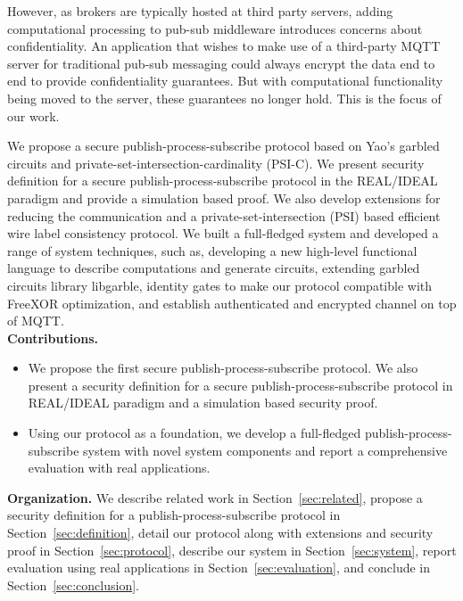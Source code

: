 However, as brokers are typically hosted at third party servers, adding
computational processing to pub-sub middleware  introduces concerns about
confidentiality. An application that wishes to make use of a third-party MQTT
server for traditional pub-sub messaging could always encrypt the data end to
end to provide confidentiality guarantees. But with computational functionality
being moved to the server, these guarantees no longer hold. This is the focus
of our work.

We propose a secure publish-process-subscribe protocol based on Yao's garbled
circuits and private-set-intersection-cardinality (PSI-C). We present security
definition for a secure publish-process-subscribe protocol in the REAL/IDEAL
paradigm and provide a simulation based proof. We also develop extensions for
reducing the communication and a private-set-intersection (PSI) based efficient
wire label consistency protocol. We built a full-fledged system and developed a
range of system techniques, such as, developing a new high-level functional
language to describe computations and generate circuits, extending garbled
circuits library libgarble, identity gates to make our protocol compatible with
FreeXOR optimization, and establish authenticated and encrypted channel on top
of MQTT.  \\[6pt]
\noindent\textbf{Contributions.}

\begin{itemize}[leftmargin=*,itemsep=4pt,topsep=4pt]

	\item We propose the first secure publish-process-subscribe protocol. We also
		present a security definition for a secure publish-process-subscribe
		protocol in REAL/IDEAL paradigm and a simulation based security proof.

	\item Using our protocol as a foundation, we develop a full-fledged
		publish-process-subscribe system with novel system components and report a
		comprehensive evaluation with real applications.

\end{itemize}

\noindent\textbf{Organization.} We describe related work in
Section~\ref{sec:related}, propose a security definition for a
publish-process-subscribe protocol in Section~\ref{sec:definition}, detail our
protocol along with extensions and security proof in
Section~\ref{sec:protocol}, describe our system in Section~\ref{sec:system},
report evaluation using real applications in Section~\ref{sec:evaluation}, and
conclude in Section~\ref{sec:conclusion}.





